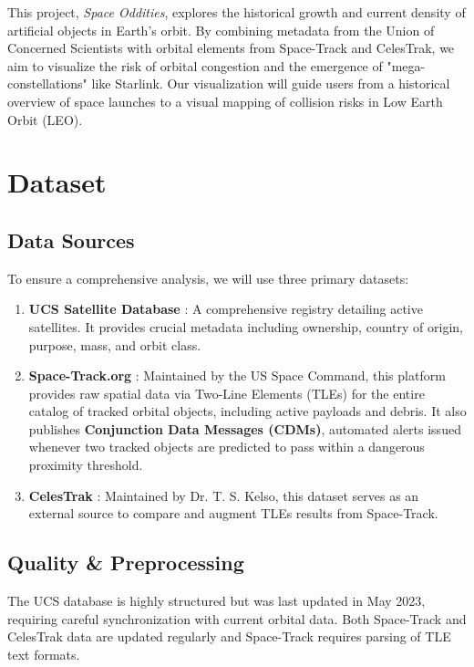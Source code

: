 \begin{summary}
    This project, \textit{Space Oddities}, explores the historical growth and current density of artificial objects in Earth's orbit. By combining metadata from the Union of Concerned Scientists with orbital elements from Space-Track and CelesTrak, we aim to visualize the risk of orbital congestion and the emergence of "mega-constellations" like Starlink. Our visualization will guide users from a historical overview of space launches to a visual mapping of collision risks in Low Earth Orbit (LEO).
\end{summary}

\section{Dataset}

\subsection{Data Sources}
To ensure a comprehensive analysis, we will use three primary datasets:
\begin{enumerate}
    \item \textbf{UCS Satellite Database} \cite{ucs-database}: A comprehensive registry detailing active satellites. It provides crucial metadata including ownership, country of origin, purpose, mass, and orbit class.
    \item \textbf{Space-Track.org} \cite{space-track}: Maintained by the US Space Command, this platform provides raw spatial data via Two-Line Elements (TLEs) for the entire catalog of tracked orbital objects, including active payloads and debris. It also publishes \textbf{Conjunction Data Messages (CDMs)}, automated alerts issued whenever two tracked objects are predicted to pass within a dangerous proximity threshold.
    \item \textbf{CelesTrak} \cite{celestrak}: Maintained by Dr. T. S. Kelso, this dataset serves as an external source to compare and augment TLEs results from Space-Track.
\end{enumerate}

\subsection{Quality \& Preprocessing}
The UCS database is highly structured but was last updated in May 2023, requiring careful synchronization with current orbital data. Both Space-Track and CelesTrak data are updated regularly and Space-Track requires parsing of TLE text formats.

